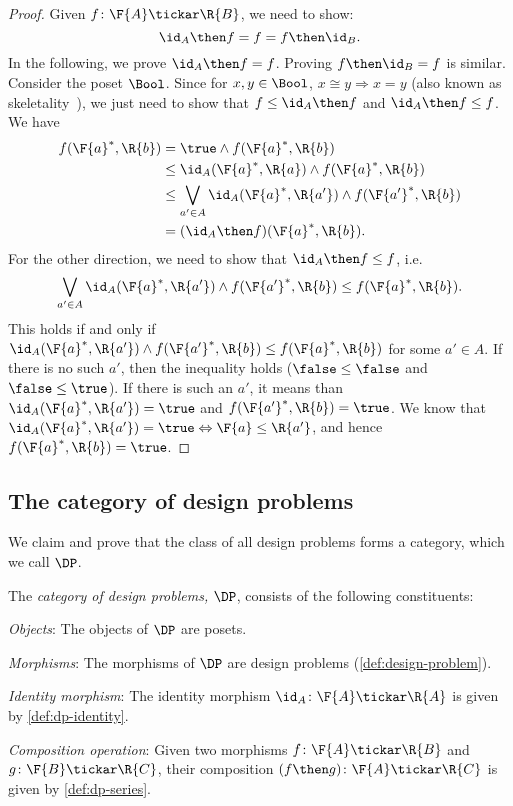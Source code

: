 \begin{proof}
Given $f\colon \F{A}\tickar \R{B}$, we need to show:
\begin{equation}
    \id_A \then f= f = f\then \id_B.
\end{equation}
In the following, we prove $\id_A \then f = f$. Proving $f\then \id_B=f$ is similar.
Consider the poset $\Bool$. Since for $x,y\in \Bool$, $x\cong y \Rightarrow x=y$ (also known as skeletality~\cite{fong}), we just need to show that $f\leq \id_A\then f$ and $\id_A\then f\leq f$.
We have
\begin{equation}
\begin{aligned}
        f(\F{a}^*,\R{b})&=\true \wedge f(\F{a}^*,\R{b})\\
        &\leq \id_A(\F{a}^*,\R{a}) \wedge f(\F{a}^*,\R{b})\\
        &\leq \bigvee_{a'\in A}\id_A(\F{a}^*,\R{a'})\wedge f(\F{a'}^*,\R{b})\\
        &=(\id_A\then f)(\F{a}^*,\R{b}).
\end{aligned}
\end{equation}
For the other direction, we need to show that $\id_A\then f\leq f$, i.e.
\begin{equation}
    \bigvee_{a'\in A}\id_A(\F{a}^*,\R{a'})\wedge f(\F{a'}^*,\R{b}) \leq f(\F{a}^*,\R{b}).
\end{equation}
This holds if and only if $\id_A(\F{a}^*,\R{a'})\wedge f(\F{a'}^*,\R{b}) \leq f(\F{a}^*,\R{b})$ for some $a'\in A$. If there is no such $a'$, then the inequality holds ($\false \leq \false$ and $\false \leq \true$). If there is such an $a'$, it means than $\id_A(\F{a}^*,\R{a'})=\true$ and $f(\F{a'}^*,\R{b})=\true$. We know that $\id_A(\F{a}^*,\R{a'})=\true \Leftrightarrow \F{a}\leq \R{a'}$, and hence $f(\F{a}^*,\R{b})=\true$.
\end{proof}

\subsection{The category of design problems}

We claim and prove that the class of all design problems forms a category, which we call $\DP$.

\begin{definition}[Category $\DP$]
\label{define:DP}
The \emph{category of design problems, $\DP$}, consists of the following constituents:
%
\begin{compactenum}
\item \emph{Objects}: The objects of $\DP$ are posets.
\item \emph{Morphisms}: The morphisms of $\DP$ are design problems (\cref{def:design-problem}).
\item \emph{Identity morphism}: The identity morphism $\id_A \colon \F{A} \tickar \R{A}$ is given by \cref{def:dp-identity}.
\item \emph{Composition operation}: Given two morphisms $f \colon  \F{A} \tickar \R{B}$ and $g \colon \F{B} \tickar \R{C}$, their
composition $(f\then g)\colon  \F{A} \tickar \R{C}$ is
given by \cref{def:dp-series}.
\end{compactenum}
\end{definition}

